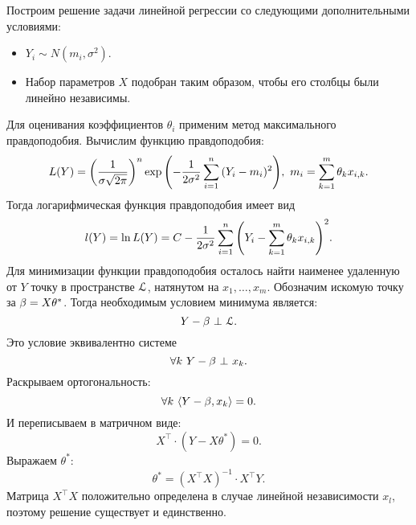 Построим решение задачи линейной регрессии со следующими дополнительными
условиями:
\begin{itemize}
    \item $Y_i \sim N(m_i, \sigma^2)$.
    \item Набор параметров $X$ подобран таким образом, чтобы его столбцы
        были линейно независимы.
\end{itemize}

Для оценивания коэффициентов $\theta_i$ применим метод максимального
правдоподобия. Вычислим функцию правдоподобия:
\[
    L(Y) = \parens*{\frac{1}{\sigma \sqrt{2 \pi}}}^n \exp
    {\parens*{-\frac{1}{2 \sigma^2} \sum_{i = 1}^{n}{(Y_i - m_i)^2}}},~
    m_i = \sum_{k = 1}^{m}{\theta_k x_{i, k}}
.\]
Тогда логарифмическая функция правдоподобия имеет вид
\[
    l(Y) = \ln{L(Y)} = C - \frac{1}{2 \sigma^2} \sum_{i = 1}^{n}
    {\parens*{Y_i - \sum_{k = 1}^m{\theta_k x_{i, k}}}^2}
.\]
Для минимизации функции правдоподобия осталось найти наименее удаленную от $Y$
точку в пространстве $\cL$, натянутом на $x_1, \ldots, x_m$. Обозначим
искомую точку за $\b = X \theta^*$. Тогда необходимым условием минимума является:
\[
    Y - \b ~\bot~ \cL
.\]
Это условие эквивалентно системе
\[
    \forall k~ Y - \b ~\bot~ x_k
.\]
Раскрываем ортогональность:
\[
    \forall k~ \scp{Y - \b}{x_k} = 0
.\]
И переписываем в матричном виде:
\[
    X^{\top} \cdot (Y - X \theta^*) = 0
.\]
Выражаем $\theta^*$:
\[
    \theta^* = (X^{\top} X)^{-1} \cdot X^\top Y
.\]
Матрица $X^\top X$ положительно определена в случае линейной независимости
$x_l$, поэтому решение существует и единственно.

